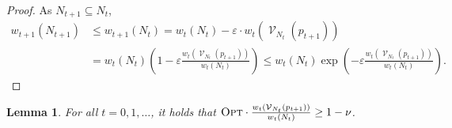 \documentclass[a4paper,11pt]{article}
\newtheorem{lemma}[theorem]{Lemma}
\def\cV{\mathcal V}
\def\eps{\varepsilon}
\newcommand{\Vis}{\operatorname{\cV}}
\def \OPT {\textsc{Opt}}
\begin{document}
\begin{proof}
	As $N_{t+1}\subseteq N_t$,
	\begin{align*}
	w_{t+1}(N_{t+1})&\le w_{t+1}(N_t)
	=  w_t(N_{t})-\eps\cdot w_t(\Vis_{N_t}(p_{t+1}))\nonumber \\
	&=  w_t(N_t)  \left(1-\eps\frac{ w_t(\Vis_{N_t}(p_{t+1}))}{w_t(N_t)}\right) 
	\leq  w_t(N_t)\exp\left(-\eps\frac{ w_t(\Vis_{N_t}(p_{t+1}))}{w_t(N_t)}\right).
	\end{align*}
\end{proof}

\begin{lemma}
	For all $t=0,1,\ldots$, it holds that $\OPT\cdot\frac{w_{t}(\Vis_{N_t}(p_{t+1}))}{w_t(N_t)} \geq 1-\nu$. \label{lem1}
\end{lemma}
\end{document}
